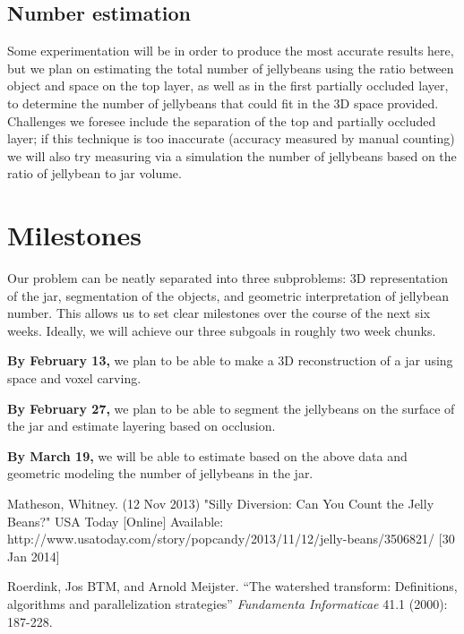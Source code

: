 \documentclass{article}
\begin{document}
\subsection*{Number estimation} 

Some experimentation will be in order to produce the most accurate results here, but we plan on estimating the total number of jellybeans using the ratio between object and space on the top layer, as well as in the first partially occluded layer, to determine the number of jellybeans that could fit in the 3D space provided. Challenges we foresee include the separation of the top and partially occluded layer; if this technique is too inaccurate (accuracy measured by manual counting) we will also try measuring via a simulation the number of jellybeans based on the ratio of jellybean to jar volume.

\section*{Milestones}

Our problem can be neatly separated into three subproblems: 3D representation of the jar, segmentation of the objects, and geometric interpretation of jellybean number. This allows us to set clear milestones over the course of the next six weeks. Ideally, we will achieve our three subgoals in roughly two week chunks.

\textbf{By February 13,} we plan to be able to make a 3D reconstruction of a jar using space and voxel carving.

\textbf{By February 27,} we plan to be able to segment the jellybeans on the surface of the jar and estimate layering based on occlusion.

\textbf{By March 19,} we will be able to estimate based on the above data and geometric modeling the number of jellybeans in the jar. 

\begin{thebibliography}{9}

	Matheson, Whitney. (12 Nov 2013) "Silly Diversion: Can You Count the Jelly Beans?" USA Today 		[Online] Available: http://www.usatoday.com/story/popcandy/2013/11/12/jelly-beans/3506821/ [30 Jan 2014]
	
Roerdink, Jos BTM, and Arnold Meijster. ``The watershed transform: Definitions, algorithms and parallelization strategies'' \emph{Fundamenta Informaticae} 41.1 (2000): 187-228.

\end{thebibliography}
\end{document}

